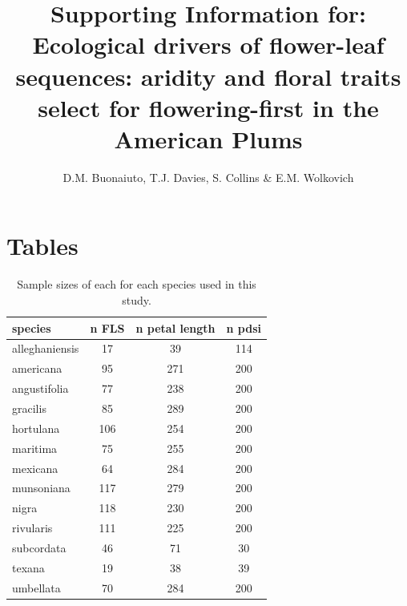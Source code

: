 \documentclass{article}[11pt]
\title{Supporting Information for: Ecological drivers of flower-leaf sequences: aridity and floral traits select for flowering-first in the American Plums}
\author{D.M. Buonaiuto, T.J. Davies, S. Collins \& E.M. Wolkovich}
\date{}
\begin{document}

\maketitle

\section*{Tables}
\begin{table}[ht]
\centering
\begin{tabular}{|lccc|}
  \hline
  species & n FLS & n petal length & n pdsi \\ 
  \hline
 alleghaniensis &  17 &  39 & 114 \\ 
americana &  95 & 271 & 200 \\ 
angustifolia &  77 & 238 & 200 \\ 
 gracilis &  85 & 289 & 200 \\ 
 hortulana & 106 & 254 & 200 \\ 
  maritima &  75 & 255 & 200 \\ 
  mexicana &  64 & 284 & 200 \\ 
  munsoniana & 117 & 279 & 200 \\ 
 nigra & 118 & 230 & 200 \\ 
   rivularis & 111 & 225 & 200 \\ 
   subcordata &  46 &  71 &  30 \\ 
   texana &  19 &  38 &  39 \\ 
  umbellata &  70 & 284 & 200 \\ 
   \hline
\end{tabular}
\caption{Sample sizes of each for each species used in this study.}
\label{tab:samps}
\end{table}
\end{document}

